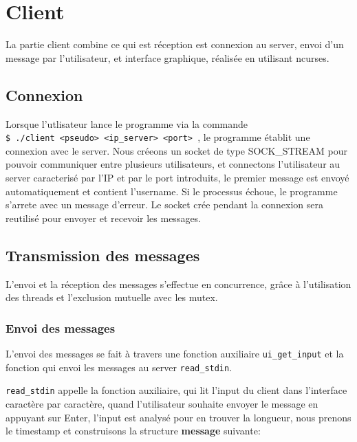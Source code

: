\documentclass[11pt]{article}
\begin{document}
    \section{Client}
    La partie client combine ce qui est réception est connexion au server,
    envoi d'un message par l'utilisateur, et interface graphique, 
    réalisée en utilisant ncurses.
        \subsection{Connexion}
        Lorsque l'utlisateur lance le programme via la commande \\
        \texttt{\$ ./client <pseudo> <ip\_server> <port> }, le programme établit une 
        connexion avec le server.
        Nous créeons un socket de type SOCK\_STREAM pour pouvoir communiquer entre
        plusieurs utilisateurs, et connectons l'utilisateur au server caracterisé 
        par l'IP et par le port introduits,
        le premier message est envoyé automatiquement et contient l'username.
        Si le processus échoue, le programme s'arrete avec un message d'erreur.
        Le socket crée pendant la connexion sera reutilisé pour envoyer et recevoir les messages.
        \subsection{Transmission des messages}
            L'envoi et la réception des messages s'effectue en concurrence,
            grâce à l'utilisation des threads et l'exclusion mutuelle avec les mutex.
            \subsubsection{Envoi des messages}
                L'envoi des messages se fait à travers une fonction auxiliaire
                \texttt{ui\_get\_input} et la fonction qui envoi les messages
                au server \texttt{read\_stdin}.

                \texttt{read\_stdin} appelle la fonction auxiliaire,
                qui lit l'input du client dans l'interface
                caractère par caractère, quand l'utilisateur souhaite 
                envoyer le message en appuyant sur Enter, l'input est analysé
                pour en trouver la longueur, nous prenons le timestamp et  
                construisons la structure \textbf{message} suivante:
                
\end{document}
